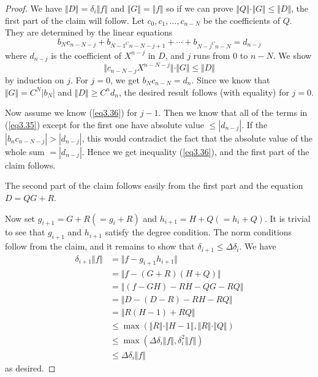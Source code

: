 \begin{proof}
We have $\Vert D\Vert=\delta_{i}\Vert f\Vert$ and $\Vert G\Vert=\Vert f\Vert$ so if we can prove $\Vert Q\Vert\cdot\Vert G\Vert\leq\Vert D\Vert$, the first part of the claim will follow. Let $c_{0},c_{1},\ldots,c_{n-N}$ be the coefficients of $Q$. They are determined by the linear equations
\begin{equation}
\label{eq3.35}
b_{N}c_{n-N-j}+b_{N-1^{C}n-N-j+1}+\cdots+b_{N-j^{C}n-N}=d_{n-j}
\end{equation}
where $d_{n-j}$ is the coefficient of $X^{n-j}$ in $D$, and $j$ runs from $0$ to $n-N$. We show
\begin{equation}
\label{eq3.36}
\Vert c_{n-N-j}X^{n-N-j}\Vert\cdot\Vert G\Vert\leq\Vert D\Vert
\end{equation}
by induction on $j$. For $j=0$, we get $b_{N}c_{n-N}=d_{n}$. Since we know that $\Vert G\Vert= C^{N}|b_{N}|$ and $\Vert D\Vert\geq C^{n}d_{n}$, the desired result follows (with equality) for $j=0$.

Now assume we know (\ref{eq3.36}) for $j-1$. Then we know that all of the terms in (\ref{eq3.35}) except for the first one have absolute value $\leq|d_{n-j}|$. If the $|b_{n}c_{n-N-j}|>|d_{n-j}|$, this would contradict the fact that the absolute value of the whole sum $=|d_{n-j}|$. Hence we get inequality (\ref{eq3.36}), and the first part of the claim follows.

The second part of the claim follows easily from the first part and the equation $D=QG+R$.

Now set $g_{i+1}=G+R(=g_{i}+R)$ and $h_{i+1}=H+Q(=h_{i}+Q)$. It is trivial to see that $g_{i+1}$ and $h_{i+1}$ satisfy the degree condition. The norm conditions follow from the claim, and it remains to show that $\delta_{i+1}\leq\Delta\delta_{i}$. We have
\begin{align*}
\delta_{i+1}\Vert f\Vert&=\Vert f-g_{i+1}h_{i+1}\Vert\\
&=\Vert f-(G+R)(H+Q)\Vert\\
&=\Vert(f-GH)-RH-QG-RQ\Vert\\
&=\Vert D-(D-R)-RH-RQ\Vert\\
&=\Vert R(H-1)+RQ\Vert\\
&\leq\max(\Vert R\Vert\cdot\Vert H-1\Vert,\Vert R\Vert\cdot\Vert Q\Vert)\\
&\leq\max(\Delta\delta_{i}\Vert f\Vert,\delta_{i}^{2}\Vert f\Vert)\\
&\leq\Delta\delta_{i}\Vert f\Vert
\end{align*}
as desired.
\end{proof}

